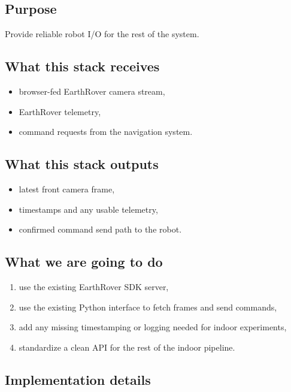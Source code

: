 \documentclass[11pt,a4paper]{article}
\begin{document}
\subsection{Purpose}

Provide reliable robot I/O for the rest of the system.

\subsection{What this stack receives}

\begin{itemize}[nosep]
  \item browser-fed EarthRover camera stream,
  \item EarthRover telemetry,
  \item command requests from the navigation system.
\end{itemize}

\subsection{What this stack outputs}

\begin{itemize}[nosep]
  \item latest front camera frame,
  \item timestamps and any usable telemetry,
  \item confirmed command send path to the robot.
\end{itemize}

\subsection{What we are going to do}

\begin{enumerate}[nosep]
  \item use the existing EarthRover SDK server,
  \item use the existing Python interface to fetch frames and send commands,
  \item add any missing timestamping or logging needed for indoor experiments,
  \item standardize a clean API for the rest of the indoor pipeline.
\end{enumerate}

\subsection{Implementation details}
\end{document}
